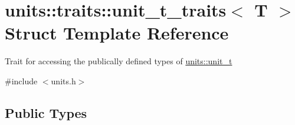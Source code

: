 \hypertarget{structunits_1_1traits_1_1unit__t__traits}{}\section{units\+:\+:traits\+:\+:unit\+\_\+t\+\_\+traits$<$ T $>$ Struct Template Reference}
\label{structunits_1_1traits_1_1unit__t__traits}


Trait for accessing the publically defined types of {\ttfamily \hyperlink{classunits_1_1unit__t}{units\+::unit\+\_\+t}}  




{\ttfamily \#include $<$units.\+h$>$}

\subsection*{Public Types}
